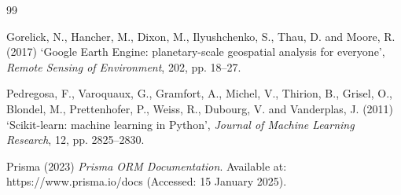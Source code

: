 \documentclass[12pt,a4paper]{report}
\begin{document}

\setcounter{chapter}{5}   %



\clearpage
{}

\begin{thebibliography}{99}

Gorelick, N., Hancher, M., Dixon, M., Ilyushchenko, S., Thau, D. and Moore, R. (2017) `Google Earth Engine: planetary-scale geospatial analysis for everyone', \textit{Remote Sensing of Environment}, 202, pp. 18--27.

Pedregosa, F., Varoquaux, G., Gramfort, A., Michel, V., Thirion, B., Grisel, O., Blondel, M., Prettenhofer, P., Weiss, R., Dubourg, V. and Vanderplas, J. (2011) `Scikit-learn: machine learning in Python', \textit{Journal of Machine Learning Research}, 12, pp. 2825--2830.

Prisma (2023) \textit{Prisma ORM Documentation}. Available at: https://www.prisma.io/docs (Accessed: 15 January 2025).

\end{thebibliography}
\end{document}
